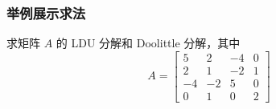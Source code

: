        \subsubsection{举例展示求法}
            \begin{problem}
                \par 求矩阵 $A$ 的 LDU 分解和 Doolittle 分解，其中
                \begin{equation*}
                    A = \begin{bmatrix}
                        5 & 2 & -4 & 0 \\ 2 & 1 & -2 & 1 \\ -4 & -2 & 5 & 0 \\ 0 & 1 & 0 & 2
                    \end{bmatrix}
                \end{equation*}
             \end{problem}
